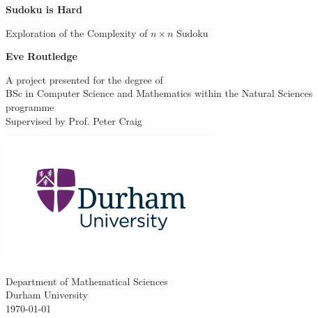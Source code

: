 \begin{titlepage}
   \begin{center}
       \vspace*{1cm}

	\Huge
       \textbf{Sudoku is Hard}

\LARGE
       \vspace{0.5cm}
        Exploration of the Complexity of $n\times n$ Sudoku
            
       \vspace{0.5cm}

       \textbf{Eve Routledge}

       \vfill
        \large    
       A project presented for the degree of\\
       BSc in Computer Science and Mathematics within the Natural Sciences programme\\
	Supervised by Prof. Peter Craig
            
       \vspace{0.8cm}
     
       \includegraphics[width=0.6\textwidth]{DurhamUniversityMasterLogo_RGB.jpg}
            
       Department of Mathematical Sciences\\
       Durham University\\
\today
            
   \end{center}
\end{titlepage}